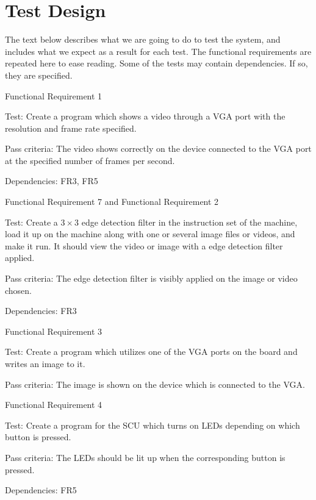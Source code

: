 \section{Test Design}

The text below describes what we are going to do to test the system, and
includes what we expect as a result for each test. The functional requirements
are repeated here to ease reading. Some of the tests may contain
dependencies\footnotemark. If so, they are specified.


{\sc Functional Requirement 1}
\begin{Test}
  {\em \FRI}

  {\sc Test:} Create a program which shows a video through a \ac{VGA} port with
  the resolution and frame rate specified.

  {\sc Pass criteria:} The video shows correctly on the device connected to the
  \ac{VGA} port at the specified number of frames per second.
  
  {\sc Dependencies:} FR3, FR5
\end{Test}

{\sc Functional Requirement 7 and Functional Requirement 2}
\begin{Test}
  {\em \FRVII}
  
  {\sc Test:} Create a $3\times3$ edge detection filter in the instruction set
  of the machine, load it up on the machine along with one or several image
  files or videos, and make it run. It should view the video or image with a
  edge detection filter applied.

  {\sc Pass criteria:} The edge detection filter is visibly applied on the
  image or video chosen.

  {\sc Dependencies:} FR3
\end{Test}

{\sc Functional Requirement 3}
\begin{Test}
  {\em \FRIII}
  
  {\sc Test:} Create a program which utilizes one of the \ac{VGA} ports on the
  board and writes an image to it.

  {\sc Pass criteria:} The image is shown on the device which is connected to
  the \ac{VGA}.
\end{Test}

{\sc Functional Requirement 4}
\begin{Test}
  {\em \FRIV}
  
  {\sc Test:} Create a program for the \ac{SCU} which turns on \acp{LED}
  depending on which button is pressed.

  {\sc Pass criteria:} The \acp{LED} should be lit up when the corresponding
  button is pressed.

  {\sc Dependencies:} FR5
\end{Test}

